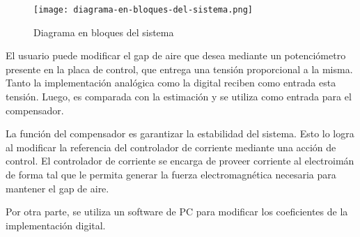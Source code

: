 \begin{figure}[H]
	\centering
	\texttt{[image: diagrama-en-bloques-del-sistema.png]}
	\caption{Diagrama en bloques del sistema}
	\label{fig:img_modelo_bloques1}
\end{figure}


\noindent El usuario puede modificar el gap de aire que desea mediante un potenci\'{o}metro presente en la placa de control, que entrega una tensi\'{o}n proporcional a la misma. Tanto la implementaci\'{o}n anal\'{o}gica como la digital reciben como entrada esta tensi\'{o}n. Luego, es comparada con la estimaci\'{o}n y se utiliza como entrada para el compensador.

\noindent La funci\'{o}n del compensador es garantizar la estabilidad del sistema. Esto lo logra al modificar la referencia del controlador de corriente mediante una acci\'{o}n de control. El controlador de corriente se encarga de proveer corriente al electroim\'{a}n de forma tal que le permita generar la fuerza electromagn\'{e}tica necesaria para mantener el gap de aire. 

\noindent Por otra parte, se utiliza un software de PC para modificar los coeficientes de la implementaci\'{o}n digital.